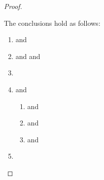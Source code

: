 \begin{grayparbox}
\begin{proof}
\begin{byCases}
\begin{pfsteps*}
    \end{pfsteps*}
    The conclusions hold as follows:
    \begin{enumerate}
      \item {} and 
      \item {} and  and 
      \item {} 
      \item {} and 
            \begin{enumerate}
      \item {} and 
      \item {} and 
      \item {} and  
    \end{enumerate}
      \item {}
    \end{enumerate}
    \resetpfcounter
\end{byCases}
\end{proof}
\end{grayparbox}



